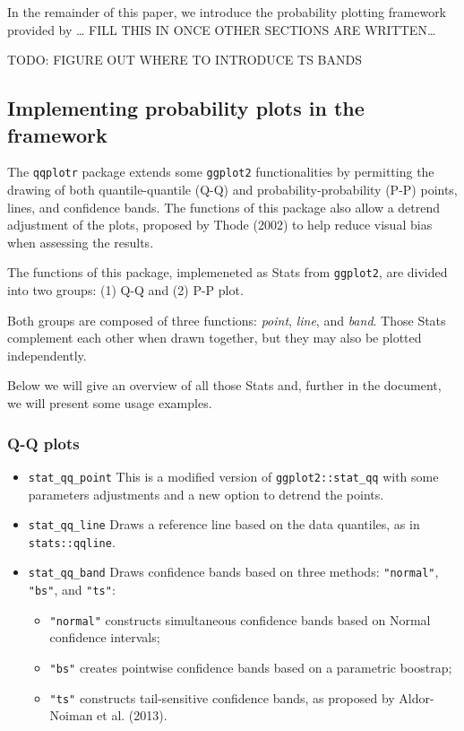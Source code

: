 In the remainder of this paper, we introduce the probability plotting
framework provided by \ldots{} FILL THIS IN ONCE OTHER
SECTIONS ARE WRITTEN\ldots{}

TODO: FIGURE OUT WHERE TO INTRODUCE TS BANDS \citep{Aldor-Noiman2013-xw}

\subsection{\texorpdfstring{Implementing probability plots in the
framework}{Implementing probability plots in the  framework}}\label{implementing-probability-plots-in-the-framework}

The \texttt{qqplotr} package extends some \texttt{ggplot2}
functionalities by permitting the drawing of both quantile-quantile
(Q-Q) and probability-probability (P-P) points, lines, and confidence
bands. The functions of this package also allow a detrend adjustment of
the plots, proposed by Thode (2002) to help reduce visual bias when
assessing the results.

The functions of this package, implemeneted as Stats from
\texttt{ggplot2}, are divided into two groups: (1) Q-Q and (2) P-P plot.

Both groups are composed of three functions: \emph{point}, \emph{line},
and \emph{band}. Those Stats complement each other when drawn together,
but they may also be plotted independently.

Below we will give an overview of all those Stats and, further in the
document, we will present some usage examples.

\subsubsection{Q-Q plots}\label{q-q-plots}

\begin{itemize}
\tightlist
\item
  \texttt{stat\_qq\_point} This is a modified version of
  \texttt{ggplot2::stat\_qq} with some parameters adjustments and a new
  option to detrend the points.
\item
  \texttt{stat\_qq\_line} Draws a reference line based on the data
  quantiles, as in \texttt{stats::qqline}.
\item
  \texttt{stat\_qq\_band} Draws confidence bands based on three methods:
  \texttt{"normal"}, \texttt{"bs"}, and \texttt{"ts"}:

  \begin{itemize}
  \tightlist
  \item
    \texttt{"normal"} constructs simultaneous confidence bands based on
    Normal confidence intervals;
  \item
    \texttt{"bs"} creates pointwise confidence bands based on a
    parametric boostrap;
  \item
    \texttt{"ts"} constructs tail-sensitive confidence bands, as
    proposed by Aldor-Noiman et al. (2013).
  \end{itemize}
\end{itemize}

